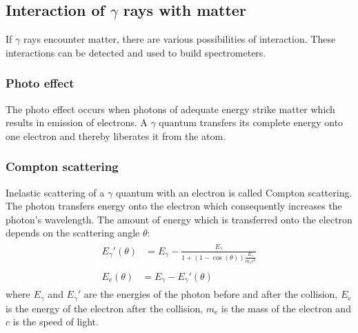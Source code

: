 \subsection{Interaction of $\gamma$ rays with matter}
If $\gamma$ rays encounter matter, there are various possibilities of interaction. These interactions can be detected and used to build spectrometers.
%
\subsubsection{Photo effect}
The photo effect occurs when photons of adequate energy strike matter which results in emission of electrons.
A $\gamma$ quantum transfers its complete energy onto one electron and thereby liberates it from the atom.
%
\subsubsection{Compton scattering}
Inelastic scattering of a $\gamma$ quantum with an electron is called Compton scattering.
The photon transfers energy onto the electron which consequently increases the photon's wavelength.
The amount of energy which is transferred onto the electron depends on the scattering angle $\theta$:
\begin{align}
    \label{eq:PhotonNachStoss}
    \begin{split}
        {E_{\gamma}}'(\theta) &= E_{\gamma} - \frac{E_{\gamma}}{1 + \left ( 1 - \cos(\theta) \right ) \frac{E_{\gamma}}{m_{\text{e}} c^2}}
    \end{split}
    \\
    \label{eq:ElektronNachStoss}
    \begin{split}
        E_{\text{e}}(\theta) &= E_{\gamma} - {E_{\gamma}}'(\theta)
    \end{split}
\end{align}
where $E_{\gamma}$ and ${E_{\gamma}}'$ are the energies of the photon before and after the collision, $E_{\text{e}}$ is the energy of the electron after the collision, $m_{\text{e}}$ is the mass of the electron and $c$ is the speed of light. \cite{AnleitungZusatz2}
%
